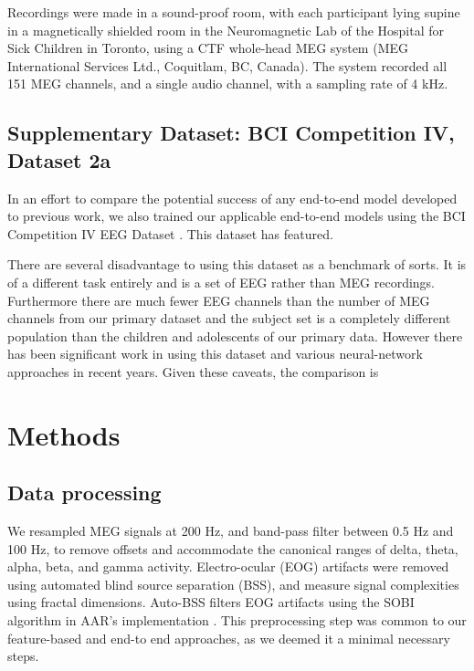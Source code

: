 \documentclass[utf8]{frontiersSCNS} %
\begin{document}
Recordings were made in a sound-proof room, with each participant lying supine in a magnetically shielded room in the Neuromagnetic Lab of the Hospital for Sick Children in Toronto, using a CTF whole-head MEG system (MEG International Services Ltd., Coquitlam, BC, Canada). The system recorded all 151 MEG channels, and a single audio channel, with a sampling rate of 4 kHz.

\subsection{Supplementary Dataset: BCI Competition IV, Dataset 2a}

In an effort to compare the potential success of any end-to-end model developed to previous work, we also trained our applicable end-to-end models using the BCI Competition IV EEG Dataset \cite{Tangermann2012}. This dataset has featured.

There are several disadvantage to using this dataset as a benchmark of sorts. It is of a different task entirely and is a set of EEG rather than MEG recordings. Furthermore there are much fewer EEG channels than the number of MEG channels from our primary dataset and the subject set is a completely different population than the children and adolescents of our primary data. However there has been significant work in using this dataset and various neural-network approaches in recent years. Given these caveats, the comparison is

\section{Methods}


\subsection{Data processing}


We resampled MEG signals at 200 Hz, and band-pass filter between 0.5 Hz and 100 Hz, to remove offsets and accommodate the canonical ranges of delta, theta, alpha, beta, and gamma activity. Electro-ocular (EOG) artifacts were removed using automated blind source separation (BSS), and measure signal complexities using fractal dimensions. Auto-BSS filters EOG artifacts using the SOBI algorithm in AAR's implementation \cite{eog}. This preprocessing step was common to our feature-based and end-to end approaches, as we deemed it a minimal necessary steps.
\end{document}
